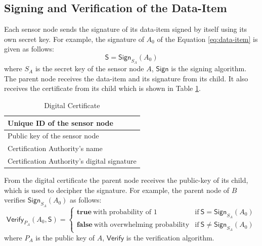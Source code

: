 	\subsection{Signing and Verification of the Data-Item}
		\label{subsection:Signing and Verification of the Data-Item}
		Each sensor node sends the signature of its data-item signed by itself using its own secret key. 
		For example, the signature of $A_{0}$ of the Equation \ref{eq:data-item} is given as follows:
		\begin{equation}
			\label{eq:sign-data-item}
			\textsf{S} = \textsf{Sign}_{S_{A}}(A_{0})
		\end{equation}
		where $S_{A}$ is the secret key of the sensor node $A$, $\textsf{Sign}$ is the signing algorithm.
		The parent node receives the data-item and its signature from its child. 
		It also receives the certificate from its child which is shown in Table \ref{table:digital-certificate}.		
		\begin{table}[!htb]	
	  		\caption{Digital Certificate}
			  \label{table:digital-certificate}
				\centering
				\begin{tabular}{ |l| }
				    \hline
				    Unique ID of the sensor node \\
				    \hline
				    Public key of the sensor node \\	
				    \hline
				    Certification Authority's name \\
				    \hline
				    Certification Authority's digital signature \\
				    \hline
				\end{tabular}
	  \end{table}
	  From the digital certificate the parent node receives the public-key of its child, which is used to decipher the signature.
	  For example, the parent node of $B$ verifies $\textsf{Sign}_{S_{A}}(A_{0})$ as follows:
	  \begin{equation}
			\textsf{Verify}_{P_{A}}(A_{0},\textsf{S}) = 
			\begin{cases}
			 \textbf{true}\ \mbox{with probability of 1} & \mbox{if}\ \textsf{S} = \textsf{Sign}_{S_{A}}(A_{0})\\
			 \textbf{false}\ \mbox{with overwhelming probability} & \mbox{if}\ \textsf{S} \neq \textsf{Sign}_{S_{A}}(A_{0})
			\end{cases}
			\label{eq:verification}
		\end{equation}
	  where $P_{A}$ is the public key of $A$, $\textsf{Verify}$ is the verification algorithm.
	
